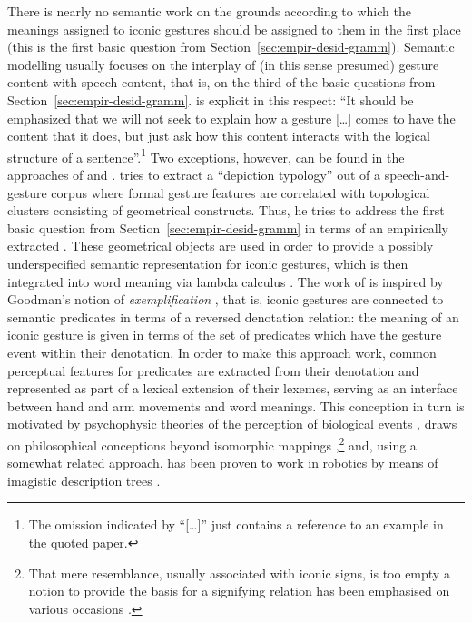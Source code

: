 \documentclass[output=paper]{langsci/langscibook}
\begin{document}
 
There is nearly no semantic work on the grounds according to which the meanings assigned to iconic gestures should be assigned to them in the first place (this is the first basic question from Section~\ref{sec:empir-desid-gramm}).
%
Semantic modelling usually focuses on the interplay of (in this sense presumed) gesture content with speech content, that is, on the third of the basic questions from Section~\ref{sec:empir-desid-gramm}.
%
\citet[]{Schlenker:2018} is explicit in this respect: \enquote{It should be emphasized that we will not seek to explain how a gesture [\ldots] comes to have the content that it does, but just ask how this content interacts with the logical structure of a sentence}.\footnote{The omission indicated by \enquote{[\ldots]} just contains a reference to an example in the quoted paper.}
%
Two exceptions, however, can be found in the approaches of \citet{Rieser:2010} and \citet{Luecking:2013:a,Luecking:2016}.
%
\citet{Rieser:2010} tries to extract a \enquote{depiction typology} out of a speech-and-gesture corpus where formal gesture features are correlated with topological clusters consisting of geometrical constructs. 
%
Thus, he tries to address the first basic question from Section~\ref{sec:empir-desid-gramm} in terms of an empirically extracted .
%
These geometrical objects are used in order to provide a possibly underspecified semantic representation for iconic gestures, which is then integrated into word meaning via lambda calculus \citep{Hahn:Rieser:2010,Rieser:2011}.
%
The work of \citet{Luecking:2013:a,Luecking:2016} is inspired by Goodman's notion of \emph{exemplification} \citep{Goodman:1976}, that is, iconic gestures are connected to semantic predicates in terms of a reversed denotation relation: the meaning of an iconic gesture is given in terms of the set of predicates which have the gesture event within their denotation.
%
In order to make this approach work, common perceptual features for predicates are extracted from their denotation and represented as part of a lexical extension of their lexemes, serving as an interface between hand and arm movements and word meanings. 
%
This conception in turn is motivated by psychophysic theories of the perception of biological events \citep{Johansson:1973}, draws on philosophical  conceptions beyond isomorphic mappings \citep{Peacocke:1987},\footnote{\label{fn:resemblance}That mere resemblance, usually associated with iconic signs, is too empty a notion to provide the basis for a signifying relation has been emphasised on various occasions \citep{Burks:1949,Bierman:1962,Eco:1976,Goodman:1976,Sonesson:1998}.} and, using a somewhat related approach, has been proven to work in robotics by means of imagistic description trees \citep{Sowa:2006:a}.
\end{document}
